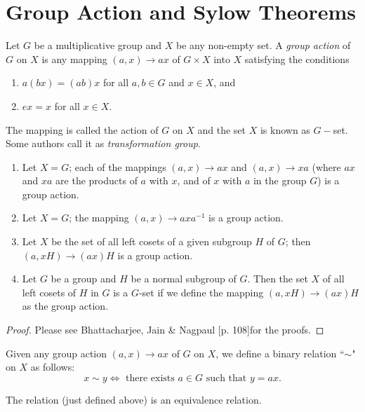 \documentclass[../main-sheet.tex]{subfiles}
\begin{document}
\chapter{Group Action and Sylow Theorems}
\begin{defn}
    Let \(G\) be a multiplicative group and \(X\) be any non-empty set. A \emph{group action} of \(G\) on \(X\) is any mapping \((a, x) \to ax\) of \(G \times X\) into \(X\) satisfying the conditions
    \begin{enumerate}[label=(\roman*)]
        \item \(a( bx ) = (ab )x\) for all \(a,b \in G\) and \(x \in X\), and
        \item \(ex = x\) for all \(x \in X\).
    \end{enumerate}
    The mapping is called the action of \(G\) on \(X\) and the set \(X\) is known as \(G-\)set. Some authors call it as \emph{transformation group}.
\end{defn}
\begin{ex}\hfill
    \begin{enumerate}[label=(\roman*)]
        \item Let \(X = G\); each of the mappings \((a, x) \to ax\) and \((a, x) \to xa\) (where \(ax\) and \(xa\) are the products of \(a\) with \(x\), and of \(x\) with \(a\) in the group \(G\)) is a group action.
        \item Let \(X = G\); the mapping \((a, x) \to axa^{-1}\) is a group action.
        \item Let \(X\) be the set of all left cosets of a given subgroup \(H\) of \(G\); then \((a, xH) \to (ax)H\) is a group action.
        \item Let \(G\) be a group and \(H\) be a normal subgroup of \(G \). Then the set \(X\) of all left cosets of \(H\) in \(G\) is a \(G\)-set if we define the mapping \((a, xH) \to (ax)H\) as the group action.
    \end{enumerate}
    \end{ex}
\begin{proof}
    Please see Bhattacharjee, Jain \& Nagpaul [p. 108]for the proofs.
\end{proof}
\begin{defn}
    Given any group action \((a, x) \to ax\) of \(G\) on \(X \), we define a binary
    relation ``\(\sim\)" on \(X\) as follows:
    \[x \sim y \Leftrightarrow \text{ there exists } a  \in G \text{ such that } y = ax.\]
\end{defn}
\begin{ex}
    The relation (just defined above) is an equivalence relation.
\end{ex}
\end{document}
